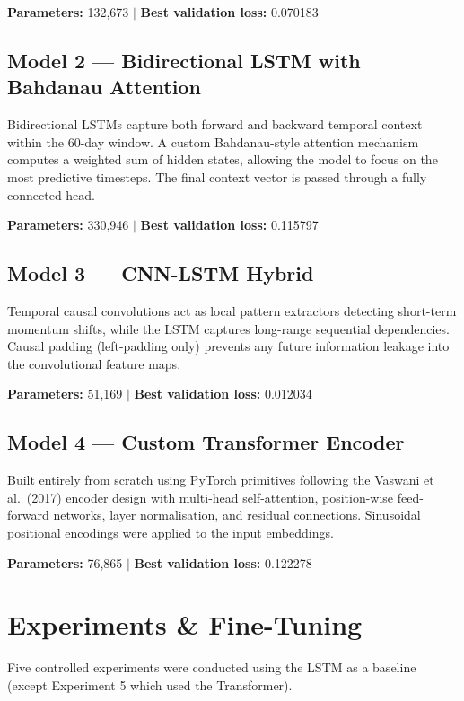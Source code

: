 \documentclass[12pt, a4paper]{article}
\begin{document}
\textbf{Parameters:} 132,673 \quad $|$ \quad \textbf{Best validation loss:} 0.070183

\subsection{Model 2 --- Bidirectional LSTM with Bahdanau Attention}

Bidirectional LSTMs capture both forward and backward temporal context within the 60-day window. A custom Bahdanau-style attention mechanism computes a weighted sum of hidden states, allowing the model to focus on the most predictive timesteps. The final context vector is passed through a fully connected head.

\textbf{Parameters:} 330,946 \quad $|$ \quad \textbf{Best validation loss:} 0.115797

\subsection{Model 3 --- CNN-LSTM Hybrid}

Temporal causal convolutions act as local pattern extractors detecting short-term momentum shifts, while the LSTM captures long-range sequential dependencies. Causal padding (left-padding only) prevents any future information leakage into the convolutional feature maps.

\textbf{Parameters:} 51,169 \quad $|$ \quad \textbf{Best validation loss:} 0.012034

\subsection{Model 4 --- Custom Transformer Encoder}

Built entirely from scratch using PyTorch primitives following the Vaswani et al.\ (2017) encoder design with multi-head self-attention, position-wise feed-forward networks, layer normalisation, and residual connections. Sinusoidal positional encodings were applied to the input embeddings.

\textbf{Parameters:} 76,865 \quad $|$ \quad \textbf{Best validation loss:} 0.122278

\section{Experiments \& Fine-Tuning}

Five controlled experiments were conducted using the LSTM as a baseline (except Experiment 5 which used the Transformer).
\end{document}
